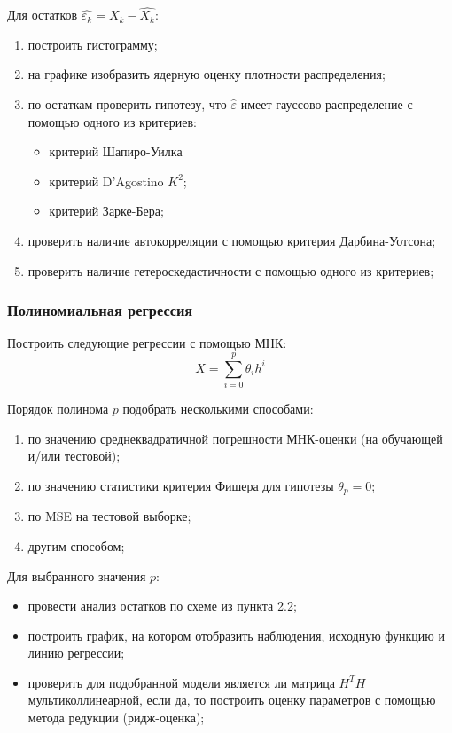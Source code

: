 \documentclass[a4paper,12pt]{article}
\begin{document}
Для остатков $\hat{\varepsilon_k} = X_k - \hat{X_k}$:
\begin{enumerate}
    \item построить гистограмму;
    \item на графике изобразить ядерную оценку плотности распределения;
    \item по остаткам проверить гипотезу, что $\hat{\varepsilon}$ имеет гауссово распределение с помощью одного из критериев:
    \begin{itemize}
        \item критерий Шапиро-Уилка
        \item критерий D'Agostino $K^2$;
        \item критерий Зарке-Бера;
    \end{itemize}
    \item проверить наличие автокорреляции с помощью критерия Дарбина-Уотсона;
    \item проверить наличие гетероскедастичности с помощью одного из критериев;
\end{enumerate}



\subsubsection{Полиномиальная регрессия}

Построить следующие регрессии с помощью МНК:
$$ X = \sum\limits_{i=0}^p \theta_i h^i $$

Порядок полинома $p$ подобрать несколькими способами:
\begin{enumerate}
    \item по значению среднеквадратичной погрешности МНК-оценки (на обучающей и/или тестовой);
    \item по значению статистики критерия Фишера для гипотезы $\theta_p = 0$;
    \item по MSE на тестовой выборке;
    \item другим способом;
\end{enumerate}

Для выбранного значения $p$:
\begin{itemize}
    \item провести анализ остатков по схеме из пункта 2.2;
    \item построить график, на котором отобразить наблюдения, исходную функцию и линию регрессии;
    \item проверить для подобранной модели является ли матрица $H^T H$ мультиколлинеарной, если да, то построить оценку параметров с помощью метода редукции (ридж-оценка);
\end{itemize}
\end{document}
